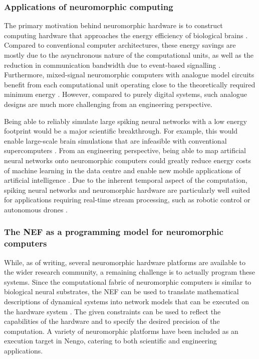 \subsubsection{Applications of neuromorphic computing}
The primary motivation behind neuromorphic hardware is to construct computing hardware that approaches the energy efficiency of biological brains \citep{boahen2017neuromorph}.
Compared to conventional computer architectures, these energy savings are mostly due to the asynchronous nature of the computational units, as well as the reduction in communication bandwidth due to event-based signalling \citep{painkras2013spinnaker}.
Furthermore, mixed-signal neuromorphic computers with analogue model circuits benefit from each computational unit operating close to the theoretically required minimum energy \citep{boahen2017neuromorph}.
However, compared to purely digital systems, such analogue designs are much more challenging from an engineering perspective.

Being able to reliably simulate large spiking neural networks with a low energy footprint would be a major scientific breakthrough.
For example, this would enable large-scale brain simulations that are infeasible with conventional supercomputers \citep{calimera2013human}.
From an engineering perspective, being able to map artificial neural networks onto neuromorphic computers could greatly reduce energy costs of machine learning in the data centre and enable new mobile applications of artificial intelligence \citep{hunsberger2016training,blouw2018benchmarking,goltz2020fast,blouw2020eventdriven}.
Due to the inherent temporal aspect of the computation, spiking neural networks and neuromorphic hardware are particularly well suited for applications requiring real-time stream processing, such as robotic control or autonomous drones \citep{komer2015biologically,yan2021comparing}.

\subsubsection{The NEF as a programming model for neuromorphic computers}
While, as of writing, several neuromorphic hardware platforms are available to the wider research community, a remaining challenge is to actually program these systems.
Since the computational fabric of neuromorphic computers is similar to biological neural substrates, the NEF can be used to translate mathematical descriptions of dynamical systems into network models that can be executed on the hardware system \citep{boahen2017neuromorph}.
The given constraints can be used to reflect the capabilities of the hardware and to specify the desired precision of the computation.
A variety of neuromorphic platforms have been included as an execution target in Nengo, catering to both scientific and engineering applications.


